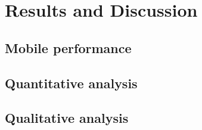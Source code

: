 \chapter{Results and Discussion}\label{chapter:results}

\section{Mobile performance}\label{results:performance}
\section{Quantitative analysis}\label{results:metrics}
\section{Qualitative analysis}\label{results:quality}

%	

